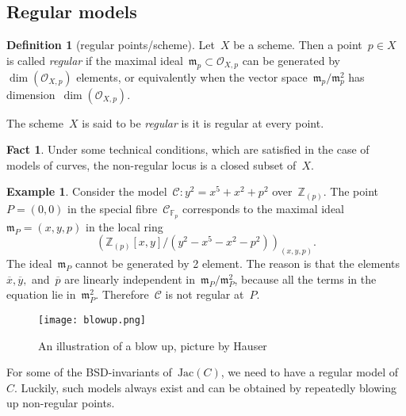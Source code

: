 \documentclass[12pt]{article}
\theoremstyle{definition}
\newtheorem{definition}[theorem]{Definition}
\newtheorem{fact}[theorem]{Fact}
\newtheorem{example}[theorem]{Example}
\numberwithin{equation}{subsection}
\newcommand{\Z}{\ensuremath{\mathbb{Z}}}
\newcommand{\F}{\ensuremath{\mathbb{F}}}
\begin{document}
\subsection{Regular models}

\begin{definition}[regular points/scheme]
Let~$X$ be a scheme. Then a point~$p \in X$ is called {\em regular} if the maximal ideal~$\mathfrak{m}_p \subset \mathcal{O}_{X,p}$ can be generated by~$\dim(\mathcal{O}_{X,p})$ elements, or equivalently when the vector space~$\mathfrak{m}_p / \mathfrak{m}_p^2$ has dimension~$\dim(\mathcal{O}_{X,p})$.

The scheme~$X$ is said to be {\em regular} is it is regular at every point.
\end{definition}

\begin{fact}
Under some technical conditions, which are satisfied in the case of models of curves, the non-regular locus is a closed subset of~$X$. 
\end{fact}

\begin{example}\label{ex:non-reg-pt}
Consider the model~$\mathcal{C} \colon y^2 = x^5 + x^2 + p^2$ over~$\Z_{(p)}$.
The point~$P = (0,0)$ in the special fibre~$\mathcal{C}_{\F_p}$ corresponds to the maximal ideal~$\mathfrak{m}_{P} = (x,y,p)$ in the local ring~$$\left(\Z_{(p)}[x,y] / (y^2 - x^5 - x^2 - p^2)\right)_{(x,y,p)}.$$
The ideal~$\mathfrak{m}_{P}$ cannot be generated by 2 element. The reason is that the elements~$\overline{x}, \overline{y},$ and~$\overline{p}$ are linearly independent in~$\mathfrak{m}_P / \mathfrak{m}_P^2$, because all the terms in the equation lie in~$\mathfrak{m}_P^2$. Therefore~$\mathcal{C}$ is not regular at~$P$.
\end{example}

\begin{figure}[h]
\centering
\texttt{[image: blowup.png]}
\caption{An illustration of a blow up, picture by Hauser}
\end{figure}

For some of the BSD-invariants of~$\mathrm{Jac}(C)$, we need to have a regular model of~$C$. Luckily, such models always exist and can be obtained by repeatedly blowing up non-regular points.
\end{document}
